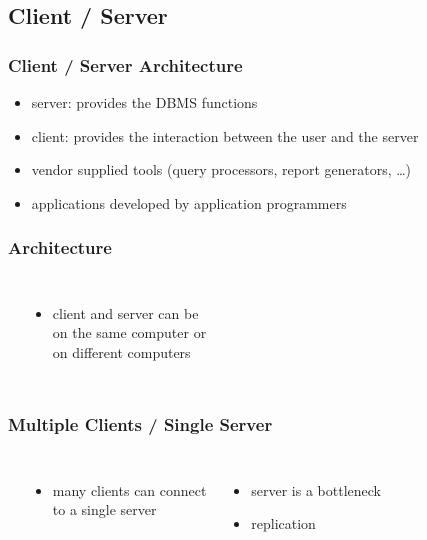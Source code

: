 \documentclass[dvipsnames]{beamer}
\theoremstyle{plain}
\begin{document}
\subsection{Client / Server}

\begin{frame}
  \frametitle{Client / Server Architecture}

  \begin{itemize}
    \item \alert{server}: provides the DBMS functions

    \bigskip
    \item \alert{client}: provides the interaction between the user and the server
    \item vendor supplied tools (query processors, report generators, \ldots)
    \item applications developed by application programmers
  \end{itemize}
\end{frame}

\begin{frame}
  \frametitle{Architecture}

  \begin{columns}
    \begin{center}
    \end{center}

    \begin{itemize}
      \item client and server can be\\
        on the same computer or\\
        on different computers
    \end{itemize}
  \end{columns}
\end{frame}

\begin{frame}
  \frametitle{Multiple Clients / Single Server}

  \begin{columns}
    \begin{center}
    \end{center}

    \begin{itemize}
      \item many clients can connect\\
        to a single server
    \end{itemize}

    \bigskip
    \begin{itemize}
      \item server is a bottleneck
      \item replication
    \end{itemize}
  \end{columns}
\end{frame}
\end{document}
